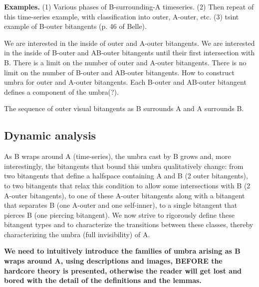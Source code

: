\documentclass[12pt]{article}
\begin{document}
{\bf Examples.}
(1) Various phases of B-surrounding-A timeseries.
(2) Then repeat of this time-series example, with classification into outer, A-outer, etc.
(3) tsint example of B-outer bitangents (p. 46 of Belle).

\begin{lemma}
We are interested in the inside of outer and A-outer bitangents.
We are interested in the inside of B-outer and AB-outer bitangents until their
first intersection with B.
There is a limit on the number of outer and A-outer bitangents.
There is no limit on the number of B-outer and AB-outer bitangents.
How to construct umbra for outer and A-outer bitangents.
Each B-outer and AB-outer bitangent defines a component of the umbra(?).
\end{lemma}

The sequence of outer visual bitangents as B surrounds A and A surrounds B.

\clearpage

\subsection{Dynamic analysis}

As B wraps around A (time-series), 
the umbra cast by B grows and, more interestingly, the bitangents that bound this umbra
qualitatively change:
from two bitangents that define a halfspace containing A and B (2 outer bitangents),
to two bitangents that relax this condition to allow some intersections with B 
(2 A-outer bitangents), 
to one of these A-outer bitangents along with a bitangent that separates B (one A-outer and one self-inner),
to a single bitangent that pierces B (one piercing bitangent).
We now strive to rigorously define these bitangent types and to 
characterize the transitions between these classes,
thereby characterizing the umbra (full invisibility) of A.

{\bf We need to intuitively introduce the families of umbra arising as B wraps around A,
using descriptions and images, BEFORE the hardcore theory is presented, otherwise
the reader will get lost and bored with the detail of the definitions and the lemmas.}
\end{document}
